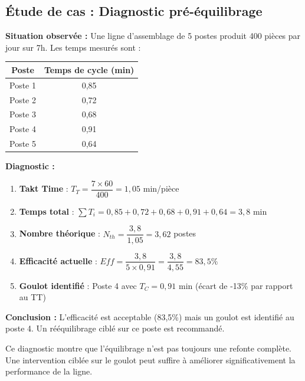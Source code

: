 \documentclass[12pt,a4paper]{article}
\newenvironment{importantnote}
  {\begin{tcolorbox}[colback=blue!5!white, colframe=blue!50!black, title=\textbf{Point Important}]\small}
  {\end{tcolorbox}}
\begin{document}
\subsection{Étude de cas : Diagnostic pré-équilibrage}

\textbf{Situation observée :}
Une ligne d'assemblage de 5 postes produit 400 pièces par jour sur 7h. Les temps mesurés sont :

\begin{table}[H]
\centering
\begin{tabular}{|c|c|}
\hline
\textbf{Poste} & \textbf{Temps de cycle (min)} \\
\hline
Poste 1 & 0,85 \\
\hline
Poste 2 & 0,72 \\
\hline
Poste 3 & 0,68 \\
\hline
Poste 4 & 0,91 \\
\hline
Poste 5 & 0,64 \\
\hline
\end{tabular}
\end{table}

\textbf{Diagnostic :}

\begin{enumerate}
    \item \textbf{Takt Time} : $T_T = \dfrac{7 \times 60}{400} = 1,05$ min/pièce
    \item \textbf{Temps total} : $\sum T_i = 0,85 + 0,72 + 0,68 + 0,91 + 0,64 = 3,8$ min
    \item \textbf{Nombre théorique} : $N_{th} = \dfrac{3,8}{1,05} = 3,62$ postes
    \item \textbf{Efficacité actuelle} : $Eff = \dfrac{3,8}{5 \times 0,91} = \dfrac{3,8}{4,55} = 83,5\%$
    \item \textbf{Goulot identifié} : Poste 4 avec $T_C = 0,91$ min (écart de -13\% par rapport au TT)
\end{enumerate}

\textbf{Conclusion :} L'efficacité est acceptable (83,5\%) mais un goulot est identifié au poste 4. Un rééquilibrage ciblé sur ce poste est recommandé.

\begin{importantnote}
Ce diagnostic montre que l'équilibrage n'est pas toujours une refonte complète. Une intervention ciblée sur le goulot peut suffire à améliorer significativement la performance de la ligne.
\end{importantnote}
\newpage
\end{document}
